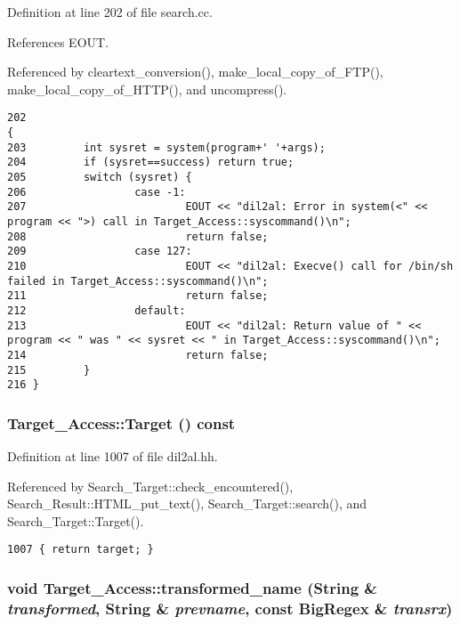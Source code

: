 Definition at line 202 of file search.cc.

References EOUT.

Referenced by cleartext\_\-conversion(), make\_\-local\_\-copy\_\-of\_\-FTP(), make\_\-local\_\-copy\_\-of\_\-HTTP(), and uncompress().



\footnotesize\begin{verbatim}202                                                                                  {
203         int sysret = system(program+' '+args);
204         if (sysret==success) return true;
205         switch (sysret) {
206                 case -1:
207                         EOUT << "dil2al: Error in system(<" << program << ">) call in Target_Access::syscommand()\n";
208                         return false;
209                 case 127:
210                         EOUT << "dil2al: Execve() call for /bin/sh failed in Target_Access::syscommand()\n";
211                         return false;
212                 default:
213                         EOUT << "dil2al: Return value of " << program << " was " << sysret << " in Target_Access::syscommand()\n";
214                         return false;
215         }
216 }
\end{verbatim}\normalsize 
{}
\subsubsection{ Target\_\-Access::Target () const\hspace{0.3cm}{\tt  [inline]}}\label{classTarget__Access_a15}




Definition at line 1007 of file dil2al.hh.

Referenced by Search\_\-Target::check\_\-encountered(), Search\_\-Result::HTML\_\-put\_\-text(), Search\_\-Target::search(), and Search\_\-Target::Target().



\footnotesize\begin{verbatim}1007 { return target; }
\end{verbatim}\normalsize 
{}
\subsubsection{\setlength{\rightskip}{0pt plus 5cm}void Target\_\-Access::transformed\_\-name ({\bf String} \& {\em transformed}, {\bf String} \& {\em prevname}, const {\bf Big\-Regex} \& {\em transrx})\hspace{0.3cm}{\tt  [protected]}}\label{classTarget__Access_b4}




